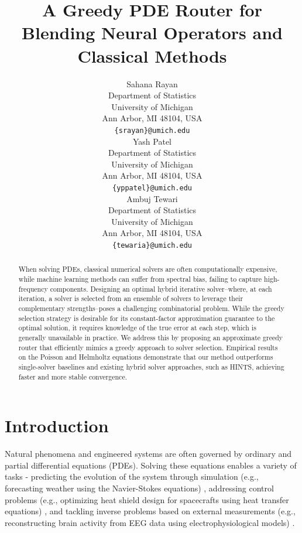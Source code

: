 \documentclass{article} %
\title{A Greedy PDE Router for Blending Neural Operators and Classical Methods}
\author{Sahana Rayan \\
Department of Statistics\\
University of Michigan\\
Ann Arbor, MI 48104, USA \\
\texttt{\{srayan\}@umich.edu} \\
\And
Yash Patel \\
Department of Statistics\\
University of Michigan\\
Ann Arbor, MI 48104, USA \\
\texttt{\{yppatel\}@umich.edu} \\
\And
Ambuj Tewari \\
Department of Statistics\\
University of Michigan\\
Ann Arbor, MI 48104, USA \\
\texttt{\{tewaria\}@umich.edu} \\
}
\begin{document}
\maketitle

\begin{abstract}


When solving PDEs, classical numerical solvers are often computationally expensive, while machine learning methods can suffer from spectral bias, failing to capture high-frequency components. Designing an optimal hybrid iterative solver--where, at each iteration, a solver is selected from an ensemble of solvers to leverage their complementary strengths--poses a challenging combinatorial problem. While the greedy selection strategy is desirable for its constant-factor approximation guarantee to the optimal solution, it requires knowledge of the true error at each step, which is generally unavailable in practice. We address this by proposing an approximate greedy router that efficiently mimics a greedy approach to solver selection. Empirical results on the Poisson and Helmholtz equations demonstrate that our method outperforms single-solver baselines and existing hybrid solver approaches, such as HINTS, achieving faster and more stable convergence.

\end{abstract}

\section{Introduction}


Natural phenomena and engineered systems are often governed by ordinary and partial differential equations (PDEs). Solving these equations enables a variety of tasks - predicting the evolution of the system through simulation (e.g., forecasting weather using the Navier-Stokes equations) \citep{kalnay2003atmospheric,bauer2015quiet,staniforth1991semi}, addressing control problems (e.g., optimizing heat shield design for spacecrafts using heat transfer equations) \citep{anderson1989hypersonic,troltzsch2010optimal}, and tackling inverse problems based on external measurements (e.g., reconstructing brain activity from EEG data using electrophysiological models) \citep{baillet2001electromagnetic,grech2008review}. 
\end{document}
